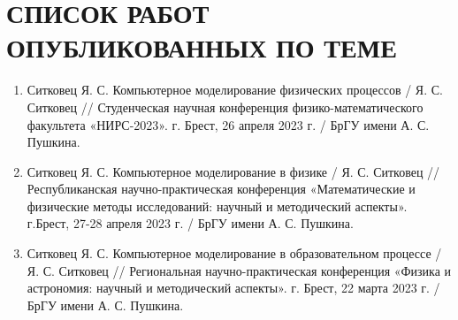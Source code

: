 \chapter*{СПИСОК РАБОТ ОПУБЛИКОВАННЫХ ПО ТЕМЕ}
\label{ch:publish}

\begin{enumerate}
    \item Ситковец Я. С. Компьютерное моделирование физических процессов / Я. С. Ситковец // Студенческая научная конференция физико-математического факультета  «НИРС-2023». г. Брест, 26 апреля 2023 г. / БрГУ имени А. С. Пушкина. \\
    \item Ситковец Я. С. Компьютерное моделирование в физике / Я. С. Ситковец // Республиканская научно-практическая конференция «Математические и физические методы исследований: научный и методический аспекты». г.Брест, 27-28 апреля 2023 г. / БрГУ имени А. С. Пушкина. \\
    \item  Ситковец Я. С. Компьютерное моделирование в образовательном процессе / Я. С. Ситковец // Региональная научно-практическая конференция  «Физика и астрономия: научный и методический аспекты». г. Брест, 22 марта 2023 г. / БрГУ имени А. С. Пушкина.
\end{enumerate}
